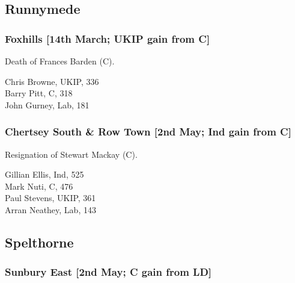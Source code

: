 \documentclass[a4paper,openany,10pt]{book}
\begin{document}
\subsection*{Runnymede}

\subsubsection*{Foxhills \hspace*{\fill}\nolinebreak[1]%
\enspace\hspace*{\fill}
[14th March; UKIP gain from C]}


Death of Frances Barden (C).



Chris Browne, UKIP, 336\\
Barry Pitt, C, 318\\
John Gurney, Lab, 181\\


\subsubsection*{Chertsey South \& Row Town \hspace*{\fill}\nolinebreak[1]%
\enspace\hspace*{\fill}
[2nd May; Ind gain from C]}


Resignation of Stewart Mackay (C).



Gillian Ellis, Ind, 525\\
Mark Nuti, C, 476\\
Paul Stevens, UKIP, 361\\
Arran Neathey, Lab, 143\\


\subsection*{Spelthorne}

\subsubsection*{Sunbury East \hspace*{\fill}\nolinebreak[1]%
\enspace\hspace*{\fill}
[2nd May; C gain from LD]}
\end{document}
